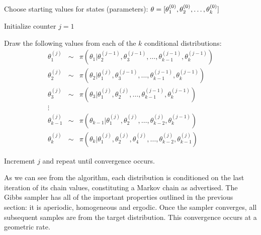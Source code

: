 \begin{list}{}
{}
\item Choose starting values for states (parameters): ${\bf \theta} = [\theta_1^{(0)},\theta_2^{(0)},\ldots,\theta_k^{(0)}]$
\item Initialize counter $j=1$
\item Draw the following values from each of the $k$ conditional distributions:
\begin{eqnarray*}
\theta_1^{(j)} &\sim& \pi(\theta_1 | \theta_2^{(j-1)},\theta_3^{(j-1)},\ldots,\theta_{k-1}^{(j-1)},\theta_k^{(j-1)}) \\
\theta_2^{(j)} &\sim& \pi(\theta_2 | \theta_1^{(j)},\theta_3^{(j-1)},\ldots,\theta_{k-1}^{(j-1)},\theta_k^{(j-1)}) \\
\theta_3^{(j)} &\sim& \pi(\theta_3 | \theta_1^{(j)},\theta_2^{(j)},\ldots,\theta_{k-1}^{(j-1)},\theta_k^{(j-1)}) \\
\vdots \\
\theta_{k-1}^{(j)} &\sim& \pi(\theta_{k-1} | \theta_1^{(j)},\theta_2^{(j)},\ldots,\theta_{k-2}^{(j)},\theta_k^{(j-1)}) \\
\theta_k^{(j)} &\sim& \pi(\theta_k | \theta_1^{(j)},\theta_2^{(j)},\theta_4^{(j)},\ldots,\theta_{k-2}^{(j)},\theta_{k-1}^{(j)})
\end{eqnarray*}
\item Increment $j$ and repeat until convergence occurs.
\end{list}

As we can see from the algorithm, each distribution is conditioned on the last iteration of its chain values, constituting a Markov chain as advertised. The Gibbs sampler has all of the important properties outlined in the previous section: it is aperiodic, homogeneous and ergodic. Once the sampler converges, all subsequent samples are from the target distribution. This convergence occurs at a geometric rate.

% 
% 
% 
% 
% 
% 
% 
% 
% 
% 

